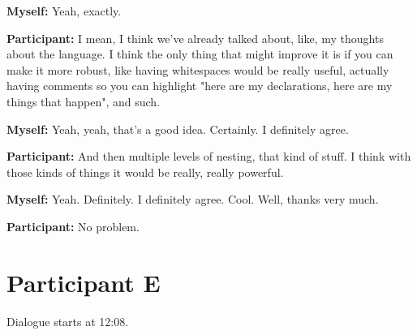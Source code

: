 \documentclass[11pt]{report}
\newcommand{\llabel}[1]{\hypertarget{llineno:#1}{\linelabel{#1}}}
\begin{document}
\begin{linenumbers}
\textbf{Myself:} Yeah, exactly.

\textbf{Participant:} I mean, I think we've already talked about, like, my thoughts about the language. I think the only thing that might improve it is if you can make it more robust, like having whitespaces would be really useful, actually having comments so you can highlight "here are my declarations, here are my things that happen", and such.

\textbf{Myself:} Yeah, yeah, that's a good idea. Certainly. I definitely agree.

\textbf{Participant:} And then multiple levels of nesting, that kind of stuff. I
think with those kinds of things it would be really, really powerful.\llabel{lne:bug2d2}

\textbf{Myself:} Yeah. Definitely. I definitely agree. Cool. Well, thanks very much.

\textbf{Participant:} No problem.

\end{linenumbers}
\resetlinenumber[1]
\section{Participant E}
Dialogue starts at 12:08.
\end{document}
